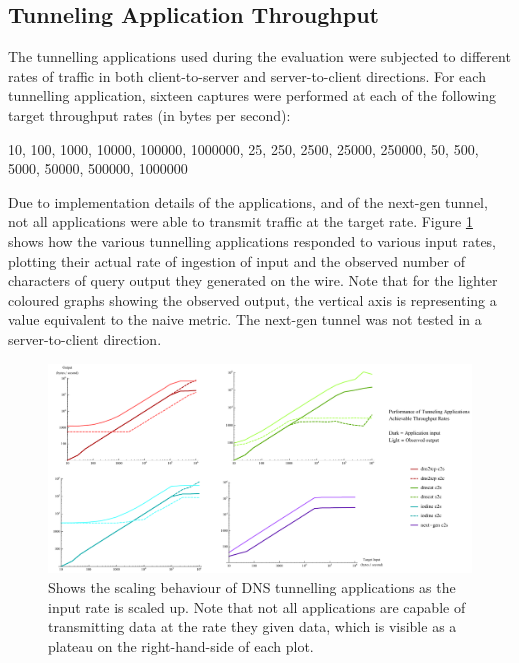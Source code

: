 \documentclass[12pt]{report}
\theoremstyle{remark}
\theoremstyle{definition}
\theoremstyle{definition}
\theoremstyle{definition}
\begin{document}
\subsection{Tunneling Application Throughput}
\label{tunapptp}
The tunnelling applications used during the evaluation were subjected to
different rates of traffic in both client-to-server and server-to-client
directions. For each tunnelling application, sixteen captures were performed at
each of the following target throughput rates (in bytes per second):

10, 100, 1000, 10000, 100000, 1000000, 25, 250, 2500, 25000, 250000, 50, 500,
5000, 50000, 500000, 1000000

Due to implementation details of the applications, and of the next-gen tunnel,
not all applications were able to transmit traffic at the target rate. Figure
\ref{tunrates} shows how the various tunnelling applications responded to
various input rates, plotting their actual rate of ingestion of input and the
observed number of characters of query output they generated on the wire. Note
that for the lighter coloured graphs showing the observed output, the vertical
axis is representing a value equivalent to the naive metric. The next-gen tunnel
was not tested in a server-to-client direction.

\begin{figure}
\centering
\includegraphics[width=\textwidth]{figures/tunrates.pdf}
\caption[DNS Tunneling Application Throughput Scaling]{Shows the scaling
behaviour of DNS tunnelling applications as the input rate is scaled up. Note
that not all applications are capable of transmitting data at the rate they
given data, which is visible as a plateau on the right-hand-side of each plot.}
\label{tunrates}
\end{figure}
\end{document}
